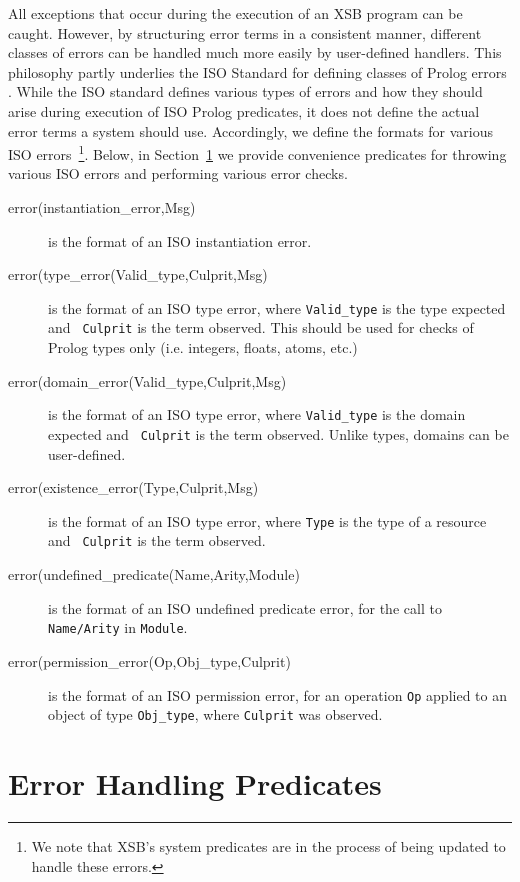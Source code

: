 All exceptions that occur during the execution of an XSB program can
be caught.  However, by structuring error terms in a consistent
manner, different classes of errors can be handled much more easily by
user-defined handlers.  This philosophy partly underlies the ISO
Standard for defining classes of Prolog errors \cite{ISO-Prolog}.
While the ISO standard defines various types of errors and how they
should arise during execution of ISO Prolog predicates, it does not
define the actual error terms a system should use.  Accordingly, we
define the formats for various ISO errors~\footnote{We note that XSB's
system predicates are in the process of being updated to handle these
errors.}.  Below, in Section~\ref{} we provide convenience predicates
for throwing various ISO errors and performing various error checks.

\begin{description}
\item[error(instantiation\_error,Msg)] is the format of an ISO
instantiation error.  
%
\item[error(type\_error(Valid\_type,Culprit,Msg)] is the format of an ISO
type error, where {\tt Valid\_type} is the type expected and {\tt
Culprit} is the term observed.  This should be used for checks of
Prolog types only (i.e. integers, floats, atoms, etc.)
%
\item [error(domain\_error(Valid\_type,Culprit,Msg)] is the format of an ISO
type error, where {\tt Valid\_type} is the domain expected and {\tt
Culprit} is the term observed.  Unlike types, domains can be
user-defined.
%
\item [error(existence\_error(Type,Culprit,Msg)] is the format of an ISO
type error, where {\tt Type} is the type of a resource and {\tt
Culprit} is the term observed.  
%
\item [error(undefined\_predicate(Name,Arity,Module)] is the format of
an ISO undefined predicate error, for the call to {\tt Name/Arity} in
{\tt Module}.
%
\item [error(permission\_error(Op,Obj\_type,Culprit)] is the format of
an ISO permission error, for an operation {\tt Op} applied to an
object of type {\tt Obj\_type}, where {\tt Culprit} was observed.
%
\end{description}

\section{Error Handling Predicates}

